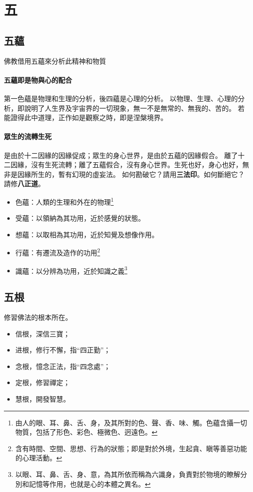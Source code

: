 \section{五}


\subsection{五蘊}
佛教借用五蘊來分析此精神和物質
\paragraph{五蘊即是物與心的配合}
第一色蘊是物理和生理的分析，後四蘊是心理的分析。
以物理、生理、心理的分析，即說明了人生界及宇宙界的一切現象，無一不是無常的、無我的、苦的。
若能證得此中道理，正作如是觀察之時，即是涅槃境界。
\paragraph{眾生的流轉生死} 是由於十二因緣的因緣促成；眾生的身心世界，是由於五蘊的因緣假合。
離了十二因緣，沒有生死流轉；離了五蘊假合，沒有身心世界。生死也好，身心也好，無非是因緣所生的，暫有幻現的虛妄法。
如何勘破它？請用\textbf{三法印}。如何斷絕它？請修\textbf{八正道}。

\begin{itemize}
  \item 色蘊：人類的生理和外在的物理\footnote{由人的眼、耳、鼻、舌、身，及其所對的色、聲、香、味、觸。色蘊含攝一切物質，包括了形色、彩色、極微色、迥遠色。}
  \item 受蘊：以領納為其功用，近於感覺的狀態。
  \item 想蘊：以取相為其功用，近於知覺及想像作用。
  \item 行蘊：有遷流及造作的功用\footnote{含有時間、空間、思想、行為的狀態；即是對於外境，生起貪、瞋等善惡功能的心理活動。}
  \item 識蘊：以分辨為功用，近於知識之義\footnote{以眼、耳、鼻、舌、身、意，為其所依而稱為六識身，負責對於物境的瞭解分別和記憶等作用，也就是心的本體之異名。}
\end{itemize}


\subsection{五根}
修習佛法的根本所在。
\begin{itemize}
  \item 信根，深信三寶；
  \item 进根，修行不懈，指“四正勤”；
  \item 念根，憶念正法，指“四念處”；
  \item 定根，修習禪定；
  \item 慧根，開發智慧。
\end{itemize}

